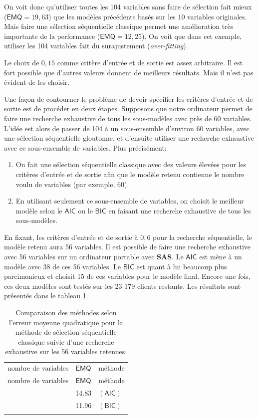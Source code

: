 \documentclass[
  11pt,
  letterpaper,
]{book}
\providecommand{\tightlist}{%
  \setlength{\itemsep}{0pt}\setlength{\parskip}{0pt}}
\theoremstyle{definition}
\theoremstyle{definition}
\theoremstyle{definition}
\theoremstyle{remark}
\begin{document}
On voit donc qu'utiliser toutes les 104 variables sans faire de sélection fait mieux (\(\mathsf{EMQ}=19,63\)) que les modèles précédents basés sur les 10 variables originales. Mais faire une sélection séquentielle classique permet une amélioration très importante de la performance (\(\mathsf{EMQ}=12,25\)). On voit que dans cet exemple, utiliser les 104 variables fait du surajustement (\emph{over-fitting}).

Le choix de \(0,15\) comme critère d'entrée et de sortie est assez arbitraire. Il est fort possible que d'autres valeurs donnent de meilleurs résultats. Mais il n'est pas évident de les choisir.

Une façon de contourner le problème de devoir spécifier les critères d'entrée et de sortie est de procéder en deux étapes. Supposons que notre ordinateur permet de faire une recherche exhaustive de tous les sous-modèles avec près de 60 variables. L'idée est alors de passer de 104 à un sous-ensemble d'environ 60 variables, avec une sélection séquentielle gloutonne, et d'ensuite utiliser une recherche exhaustive avec ce sous-ensemble de variables. Plus précisément:

\begin{enumerate}
\def\labelenumi{\arabic{enumi})}
\tightlist
\item
  On fait une sélection séquentielle classique avec des valeurs élevées pour les critères d'entrée et de sortie afin que le modèle retenu contienne le nombre voulu de variables (par exemple, 60).
\item
  En utilisant seulement ce sous-ensemble de variables, on choisit le meilleur modèle selon le \(\mathsf{AIC}\) ou le \(\mathsf{BIC}\) en faisant une recherche exhaustive de tous les sous-modèles.
\end{enumerate}

En fixant, les critères d'entrée et de sortie à \(0,6\) pour la recherche séquentielle, le modèle retenu aura 56 variables. Il est possible de faire une recherche exhaustive avec 56 variables sur un ordinateur portable avec \textbf{SAS}. Le \(\mathsf{AIC}\) est mène à un modèle avec 38 de ces 56 variables. Le \(\mathsf{BIC}\) est quant à lui beaucoup plus parcimonieux et choisit 15 de ces variables pour le modèle final. Encore une fois, ces deux modèles sont testés sur les 23 179 clients restants. Les résultats sont présentés dans le tableau \ref{tab:02-comparaisonseqexha}.

\begin{longtable}[]{@{}ccl@{}}
\caption{\label{tab:02-comparaisonseqexha} Comparaison des méthodes selon l'erreur moyenne quadratique pour la méthode de sélection séquentielle classique suivie d'une recherche exhaustive sur les 56 variables retenues.}\tabularnewline
\toprule
nombre de variables & \(\mathsf{EMQ}\) & méthode \\ \addlinespace
\midrule
\endfirsthead
\toprule
nombre de variables & \(\mathsf{EMQ}\) & méthode \\ \addlinespace
\midrule
\endhead
38 & 14.83 & \((\mathsf{AIC})\) \\ \addlinespace
15 & 11.96 & \((\mathsf{BIC})\) \\ \addlinespace
\bottomrule
\end{longtable}
\end{document}
